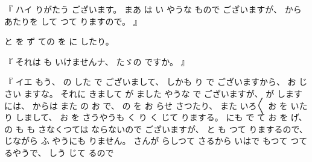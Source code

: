 %
『
ハイ
りがたう
ございます。
%
まあ
は
い
やうな
もので
ございますが、
%
から
あたりを
して
つて
りますので。
』

%
と
を
ず
ての
を
に
したり。

%
『
それは
も
いけませんナ、
%
たゞの%
ですか。
』

%
『
イエ
もう、
%
の
した
で
ございまして、
%
しかも
り
で
ございますから、
%
お
じ
さい
ますな。
%
それに
きまして
が
ました
やうな
で
ございますが、
%
が%
しますには、
%
からは
また
の
お
で、
%
の
を
お
らせ
さつたり、
%
また
いろ〳〵
お
を
いたり%
しまして、
%
お
を
%
さうやうも
く
り
く
じて
りまする。
%
にも
で
て
お
を
げ、
%
の
も
も
さなくつては
ならないので
ございますが、
%
と%
も
つて
りまするので、
%
じながら
ふ
やうにも
りません。
%
さんが
らしつて
さるから
いはで
もつて
つて
るやうで、
%
しう
じて
るので
